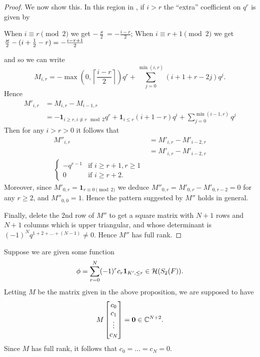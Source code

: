 \begin{proof}
  We now show this.
  In this region in , if $i > r$
  the ``extra'' coefficient on $q^r$ is given by
  \begin{itemize}
    \ii When $i \equiv r \pmod 2$ we get $-\frac{\varkappa}{2} = - \frac{i-r}{2}$;
    \ii When $i \equiv r+1 \pmod 2$ we get $\frac{\varkappa}{2} - (i + \frac{1}{2} - r) = -\frac{i-r+1}{2}$
  \end{itemize}
  and so we can write
  \[
    M_{i,r}
    = - \max\left(0, \left\lceil \frac{i-r}{2} \right\rceil \right) q^{r}
    + \sum_{j=0}^{\min(i,r)} \left( i + 1 + r - 2j \right) q^j.
  \]
  Hence
  \begin{align*}
    M'_{i,r}
    &= M_{i,r} - M_{i-1,r} \\
    &= - \mathbf{1}_{i \ge r, i \not\equiv r \mod 2} q^r
    + \mathbf{1}_{i \le r} (i+1-r) q^i
    + \sum_{j=0}^{\min(i-1,r)} q^j
  \end{align*}
  Then for any $i > r > 0$ it follows that
  \begin{align*}
    M''_{i,r}
    &= M'_{i,r} - M'_{i-2,r} \\
    &= M'_{i,r} - M'_{i-2,r} \\
    \begin{cases}
      -q^{r-1} & \text{if } i \ge r+1, r \ge 1 \\
      0 & \text{if } i \ge r+2.
    \end{cases}
  \end{align*}
  Moreover, since $M'_{0,r} = \mathbf{1}_{r \equiv 0 \pmod 2}$
  we deduce
  $M''_{0,r} = M'_{0,r} - M'_{0,r-2} = 0$
  for any $r \ge 2$, and $M''_{0,0} = 1$.
  Hence the pattern suggested by $M''$ holds in general.

  Finally, delete the 2nd row of $M''$ to get a square matrix
  with $N+1$ rows and $N+1$ columns which is upper triangular,
  and whose determinant is $(-1)^N q^{1+2+\dots+(N-1)} \neq 0$.
  Hence $M''$ has full rank.
\end{proof}

Suppose we are given some function
\[ \phi = \sum_{r=0}^N (-1)^r c_r \mathbf{1}_{K', \le r} \in \mathcal H(S_2(F)). \]
Letting $M$ be the matrix given in the above proposition, we are supposed to have
\[
  M \begin{bmatrix} c_0 \\ c_1 \\ \vdots \\ c_N \end{bmatrix}
  = \mathbf{0} \in \mathbb C^{N+2}.
\]
Since $M$ has full rank, it follows that $c_0 = \dots = c_N = 0$.
